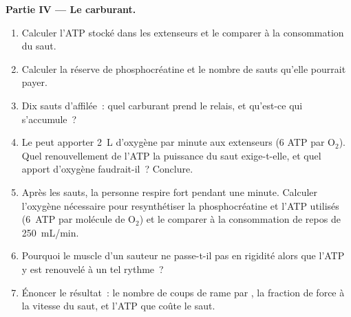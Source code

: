 \begin{problem}
\medskip
\noindent\textbf{Partie IV --- Le carburant.}
\begin{enumerate}[resume]
  \item Calculer l'ATP stocké dans les extenseurs et le comparer à la
        consommation du saut.
  \item Calculer la réserve de phosphocréatine et le nombre de sauts
        qu'elle pourrait payer.
  \item Dix sauts d'affilée~: quel carburant prend le relais, et
        qu'est-ce qui s'accumule~?
  \item Le  peut apporter \qty{2}{L} d'oxygène par minute aux
        extenseurs (6 ATP par $\mathrm{O_2}$). Quel renouvellement de
        l'ATP la puissance du saut exige-t-elle, et quel apport d'oxygène
        faudrait-il~? Conclure.
  \item Après les sauts, la personne respire fort pendant une minute.
        Calculer l'oxygène nécessaire pour resynthétiser la phosphocréatine
        et l'ATP utilisés (\qty{6}{ATP} par molécule de $\mathrm{O_2}$)
        et le comparer à la consommation de repos de
        \qty{250}{mL/min}.
  \item Pourquoi le muscle d'un sauteur ne passe-t-il pas en rigidité
        alors que l'ATP y est renouvelé à un tel rythme~?
  \item Énoncer le résultat~: le nombre de coups de rame par
        , la fraction de force à la vitesse du saut, et
        l'ATP que coûte le saut.
\end{enumerate}
\end{problem}
